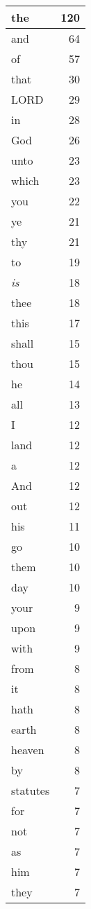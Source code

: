 \begin{center}
\begin{longtable}{l|r}
\hline \hline
\endlastfoot
the & 120 \\ \hline
and & 64 \\ \hline
of & 57 \\ \hline
that & 30 \\ \hline
LORD & 29 \\ \hline
in & 28 \\ \hline
God & 26 \\ \hline
unto & 23 \\ \hline
which & 23 \\ \hline
you & 22 \\ \hline
ye & 21 \\ \hline
thy & 21 \\ \hline
to & 19 \\ \hline
\emph{is} & 18 \\ \hline
thee & 18 \\ \hline
this & 17 \\ \hline
shall & 15 \\ \hline
thou & 15 \\ \hline
he & 14 \\ \hline
all & 13 \\ \hline
I & 12 \\ \hline
land & 12 \\ \hline
a & 12 \\ \hline
And & 12 \\ \hline
out & 12 \\ \hline
his & 11 \\ \hline
go & 10 \\ \hline
them & 10 \\ \hline
day & 10 \\ \hline
your & 9 \\ \hline
upon & 9 \\ \hline
with & 9 \\ \hline
from & 8 \\ \hline
it & 8 \\ \hline
hath & 8 \\ \hline
earth & 8 \\ \hline
heaven & 8 \\ \hline
by & 8 \\ \hline
statutes & 7 \\ \hline
for & 7 \\ \hline
not & 7 \\ \hline
as & 7 \\ \hline
him & 7 \\ \hline
they & 7 \\ \hline

\end{longtable}
\end{center}
